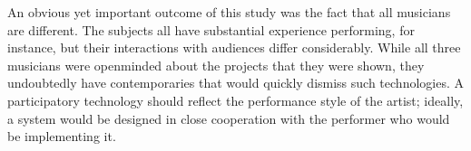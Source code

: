 An obvious yet important outcome of this study was the fact that all musicians are different. The subjects all have substantial experience performing, for instance, but their interactions with audiences differ considerably. While all three musicians were openminded about the projects that they were shown, they undoubtedly have contemporaries that would quickly dismiss such technologies. A participatory technology should reflect the performance style of the artist; ideally, a system would be designed in close cooperation with the performer who would be implementing it.

